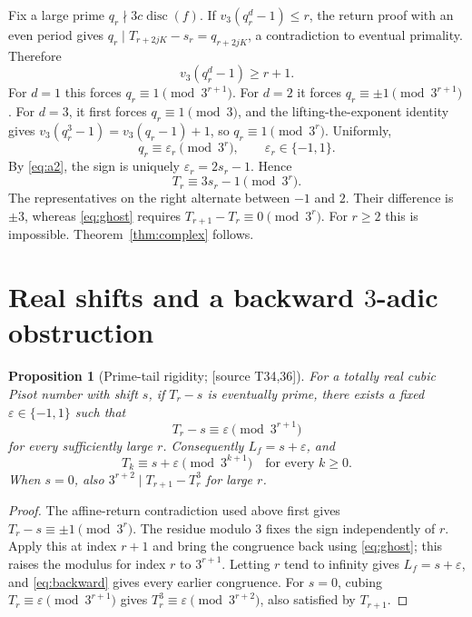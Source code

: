 \documentclass[11pt,a4paper]{article}
\newtheorem{proposition}[theorem]{Proposition}
\theoremstyle{definition}\newtheorem{definition}[theorem]{Definition}
\theoremstyle{remark}\newtheorem{remark}[theorem]{Remark}
\newcommand{\sourceT}[1]{\textup{[source T#1]}}
\begin{document}
Fix a large prime $q_r\nmid3c\operatorname{disc}(f)$. If $v_3(q_r^d-1)\le r$, the return proof with an even period gives $q_r\mid T_{r+2jK}-s_r=q_{r+2jK}$, a contradiction to eventual primality. Therefore
\[
 v_3(q_r^d-1)\ge r+1.
\]
For $d=1$ this forces $q_r\equiv1\pmod{3^{r+1}}$. For $d=2$ it forces $q_r\equiv\pm1\pmod{3^{r+1}}$. For $d=3$, it first forces $q_r\equiv1\pmod3$, and the lifting-the-exponent identity gives
$v_3(q_r^3-1)=v_3(q_r-1)+1$, so $q_r\equiv1\pmod{3^r}$. Uniformly,
\[
 q_r\equiv\varepsilon_r\pmod{3^r},\qquad \varepsilon_r\in\{-1,1\}.
\]
By \eqref{eq:a2}, the sign is uniquely $\varepsilon_r=2s_r-1$. Hence
\[
 T_r\equiv3s_r-1\pmod{3^r}.
\]
The representatives on the right alternate between $-1$ and $2$. Their difference is $\pm3$, whereas \eqref{eq:ghost} requires $T_{r+1}-T_r\equiv0\pmod{3^r}$. For $r\ge2$ this is impossible. Theorem~\ref{thm:complex} follows.

\section{Real shifts and a backward \texorpdfstring{$3$}{3}-adic obstruction}
\begin{proposition}[Prime-tail rigidity; \sourceT{34,36}]\label{prop:prime-tail}
For a totally real cubic Pisot number with shift $s$, if $T_r-s$ is eventually prime, there exists a fixed $\varepsilon\in\{-1,1\}$ such that
\[
 T_r-s\equiv\varepsilon\pmod{3^{r+1}}
\]
for every sufficiently large $r$. Consequently $L_f=s+\varepsilon$, and
\[
 T_k\equiv s+\varepsilon\pmod{3^{k+1}}\quad\text{for every }k\ge0.
\]
When $s=0$, also $3^{r+2}\mid T_{r+1}-T_r^3$ for large $r$.
\end{proposition}
\begin{proof}
The affine-return contradiction used above first gives $T_r-s\equiv\pm1\pmod{3^r}$. The residue modulo $3$ fixes the sign independently of $r$. Apply this at index $r+1$ and bring the congruence back using \eqref{eq:ghost}; this raises the modulus for index $r$ to $3^{r+1}$. Letting $r$ tend to infinity gives $L_f=s+\varepsilon$, and \eqref{eq:backward} gives every earlier congruence. For $s=0$, cubing $T_r\equiv\varepsilon\pmod{3^{r+1}}$ gives $T_r^3\equiv\varepsilon\pmod{3^{r+2}}$, also satisfied by $T_{r+1}$.
\end{proof}
\end{document}
